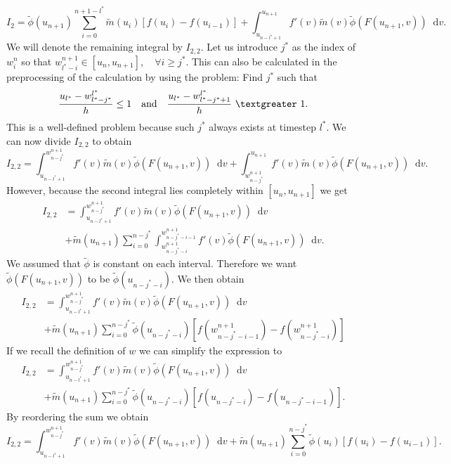\documentclass[12pt,a4paper,twoside, open=right]{scrreprt}
\theoremstyle{definition}
\theoremstyle{plain}
\newcommand{\g}{~\textgreater ~}
\newcommand{\D}{\mathop{}\!\mathrm{d}}
\begin{document}
\begin{equation}
    I_2 = \tilde{\phi}(u_{n+1})\sum_{i=0}^{n+1-l^*}\tilde{m}(u_i)[f(u_i)-f(u_{i-1})]+ \int_{u_{n-l^* +1}}^{u_{n+1}}f'(v)\tilde{m}(v)\tilde{\phi}(F(u_{n+1},v))\D v.
\end{equation}
We will denote the remaining integral by $I_{2,2}$. Let us introduce $j^*$ as the index of $w_i^{n}$ so that $w_{l^*-i}^{n+1}\in[u_n,u_{n+1}],\quad\forall i\ge j^*$. This can also be calculated in the preprocessing of the calculation by using the problem: Find $j^*$ such that
\begin{equation}
    \frac{u_{l^*}-w_{l^*-j^*}^{l^*}}{h}\le 1 \quad \text{and} \quad\frac{u_{l^*}-w_{l^*-j^*+1}^{l^*}}{h}\g 1.
\end{equation}
This is a well-defined problem because such $j^*$ always exists at timestep $l^*$. We can now divide $I_{2,2}$ to obtain
\begin{equation}
    I_{2,2}= \int_{u_{n-l^*+1}}^{w^{n+1}_{n-j^*}}f'(v)\tilde{m}(v)\tilde{\phi}(F(u_{n+1},v))\D v + \int_{w^{n+1}_{n-j^*}}^{u_{n+1}}f'(v)\tilde{m}(v)\tilde{\phi}(F(u_{n+1},v))\D v.
\end{equation}
However, because the second integral lies completely within $[u_n,u_{n+1}]$ we get 
\begin{align}
    I_{2,2}&=\int_{u_{n-l^*+1}}^{w^{n+1}_{n-j^*}}f'(v)\tilde{m}(v)\tilde{\phi}(F(u_{n+1},v))\D v \\&+\tilde{m}(u_{n+1})\sum_{i=0}^{n-j^*}\int_{w^{n+1}_{n-j^*-i}}^{w^{n+1}_{n-j^*-i-1}}f'(v)\tilde{\phi}(F(u_{n+1},v))\D v.
\end{align}
We assumed that $\tilde\phi$ is constant on each interval. Therefore we want $\tilde\phi(F(u_{n+1},v))$ to be $\tilde\phi(u_{n-j^*-i})$. We then obtain
\begin{align}
I_{2,2}&=\int_{u_{n-l^*+1}}^{w^{n+1}_{n-j^*}}f'(v)\tilde{m}(v)\tilde{\phi}(F(u_{n+1},v))\D v \\&+\tilde{m}(u_{n+1})\sum_{i=0}^{n-j^*}\tilde\phi(u_{n-j^*-i})[f(w^{n+1}_{n-j^*-i-1})-f(w_{n-j^*-i}^{n+1})]
\end{align}
If we recall the definition of $w$ we can simplify the expression to
\begin{align}
I_{2,2}&=\int_{u_{n-l^*+1}}^{w^{n+1}_{n-j^*}}f'(v)\tilde{m}(v)\tilde{\phi}(F(u_{n+1},v))\D v \\&+\tilde{m}(u_{n+1})\sum_{i=0}^{n-j^*}\tilde\phi(u_{n-j^*-i})[f(u_{n-j^*-i})-f(u_{n-j^*-i-1})].
\end{align}
By reordering the sum we obtain
\begin{equation}
    I_{2,2}=\int_{u_{n-l^*+1}}^{w^{n+1}_{n-j^*}}f'(v)\tilde{m}(v)\tilde{\phi}(F(u_{n+1},v))\D v +
    \tilde{m}(u_{n+1})\sum_{i=0}^{n-j^*}\tilde\phi(u_{i})[f(u_i)-f(u_{i-1})].
\end{equation}
\end{document}

